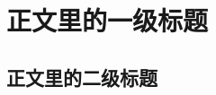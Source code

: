 \documentclass{article}
\begin{document}
\tableofcontents

\section{正文里的一级标题}
\subsection{正文里的二级标题}
\end{document}
